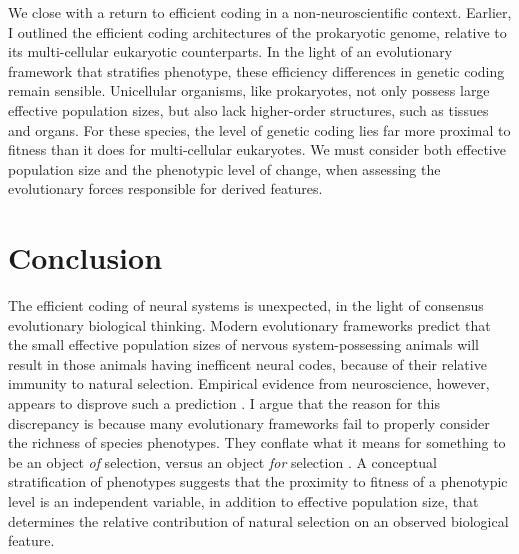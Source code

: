 \documentclass{article}
\begin{document}
We close with a return to efficient coding in a non-neuroscientific context. Earlier, I outlined the efficient coding architectures of the prokaryotic genome, relative to its multi-cellular eukaryotic counterparts. In the light of an evolutionary framework that stratifies phenotype, these efficiency differences in genetic coding remain sensible. Unicellular organisms, like prokaryotes, not only possess large effective population sizes, but also lack higher-order structures, such as tissues and organs. For these species, the level of genetic coding lies far more proximal to fitness than it does for multi-cellular eukaryotes. We must consider both effective population size and the phenotypic level of change, when assessing the evolutionary forces responsible for derived features. 


\section{Conclusion}
The efficient coding of neural systems is unexpected, in the light of consensus evolutionary biological thinking. Modern evolutionary frameworks predict that the small effective population sizes of nervous system-possessing animals will result in those animals having inefficent neural codes, because of their relative immunity to natural selection. Empirical evidence from neuroscience, however, appears to disprove such a prediction \cite{smith_lewicki_2006, olshausen_field_1996, Machens_Gollisch_Kolesnikova_Herz_2005, Pitkow_Meister_2012, barlow_1952, fairhall_deRuyterVan_2001}. I argue that the reason for this discrepancy is because many evolutionary frameworks fail to properly consider the richness of species phenotypes. They conflate what it means for something to be an object \textit{of} selection, versus an object \textit{for} selection \cite{sober1993nature, mayr_1997}. A conceptual stratification of phenotypes suggests that the proximity to fitness of a phenotypic level is an independent variable, in addition to effective population size, that determines the relative contribution of natural selection on an observed biological feature. 
\end{document}
